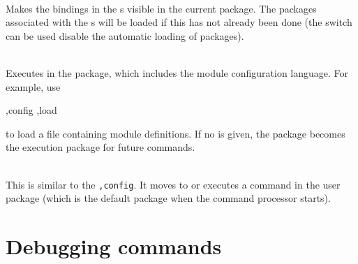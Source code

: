 \begin{description}
\item {}\\
Makes the bindings in the s visible in the current package.
The packages associated with the s will be loaded if
 this has not already been done (the  switch
 can be used disable the automatic loading of packages).

\item {}\\
Executes  in the  package, which includes
 the module configuration language.
For example, use
\begin{example}
,config ,load 
\end{example}
to load a file containing module definitions.
If no  is given, the  package becomes the
 execution package for future commands.

\item {} \\
    This is similar to the {\tt ,config}.  It
    moves to or executes a command in the user package (which is the
    default package when the \hack{} command processor starts).

\end{description}

\section{Debugging commands}
\label{debug-commands}

